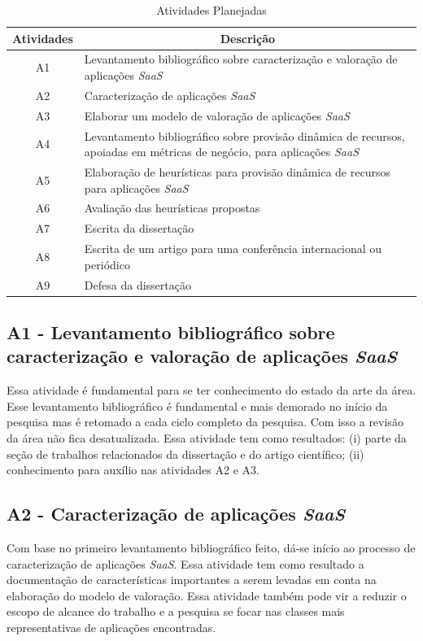 \documentclass[a4paper,titlepage,12pt]{article}
\begin{document}
\begin{table}[H]
\centering
\begin{tabular}{|c|p{}|}
    \hline
Atividades & \multicolumn{1}{c}{Descrição}\\
	\hline
A1 & Levantamento bibliográfico sobre caracterização e valoração de aplicações \textit{SaaS}\\
	\hline
A2 & Caracterização de aplicações \textit{SaaS}\\
	\hline
A3 & Elaborar um modelo de valoração de aplicações \textit{SaaS}\\
	\hline
A4 & Levantamento bibliográfico sobre provisão dinâmica de recursos, apoiadas em métricas de negócio, para aplicações \textit{SaaS}\\
	\hline
A5 & Elaboração de heurísticas para provisão dinâmica de recursos para aplicações \textit{SaaS}\\
	\hline
A6 & Avaliação das heurísticas propostas\\
	\hline
A7 & Escrita da dissertação\\
	\hline
A8 & Escrita de um artigo para uma conferência internacional ou periódico\\
	\hline
A9 & Defesa da dissertação\\
	\hline
\end{tabular}
\caption{Atividades Planejadas}
\label{table:atividades}
\end{table}

\subsection*{A1 - Levantamento bibliográfico sobre caracterização e valoração de aplicações \textit{SaaS}}
Essa atividade é fundamental para se ter conhecimento do estado da arte da área. Esse levantamento bibliográfico é fundamental e mais demorado no início da pesquisa mas é retomado a cada ciclo completo da pesquisa. Com isso a revisão da área não fica desatualizada. Essa atividade tem como resultados: (i) parte da seção de trabalhos relacionados da dissertação e do artigo científico; (ii) conhecimento para auxílio nas atividades A2 e A3.

\subsection*{A2 - Caracterização de aplicações \textit{SaaS}}
Com base no primeiro levantamento bibliográfico feito, dá-se início ao processo de caracterização de aplicações \textit{SaaS}. Essa atividade tem como resultado a documentação de características importantes a serem levadas em conta na elaboração do modelo de valoração. Essa atividade também pode vir a reduzir o escopo de alcance do trabalho e a pesquisa se focar nas classes mais representativas de aplicações encontradas.
\end{document}
